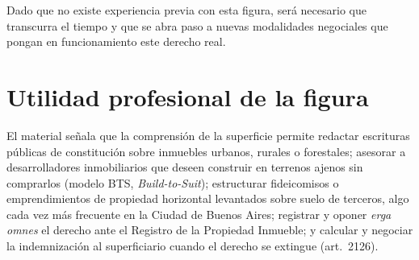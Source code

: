 \documentclass[12pt,oneside]{book}
\begin{document}
\begin{note}
Dado que no existe experiencia previa con esta figura, será necesario que transcurra el tiempo y que se abra paso a nuevas modalidades negociales que pongan en funcionamiento este derecho real.
\end{note}

\section{Utilidad profesional de la figura}

El material señala que la comprensión de la superficie permite redactar escrituras públicas de constitución sobre inmuebles urbanos, rurales o forestales; asesorar a desarrolladores inmobiliarios que deseen construir en terrenos ajenos sin comprarlos (modelo BTS, \textit{Build-to-Suit}); estructurar fideicomisos o emprendimientos de propiedad horizontal levantados sobre suelo de terceros, algo cada vez más frecuente en la Ciudad de Buenos Aires; registrar y oponer \textit{erga omnes} el derecho ante el Registro de la Propiedad Inmueble; y calcular y negociar la indemnización al superficiario cuando el derecho se extingue (art.~2126).
\end{document}
